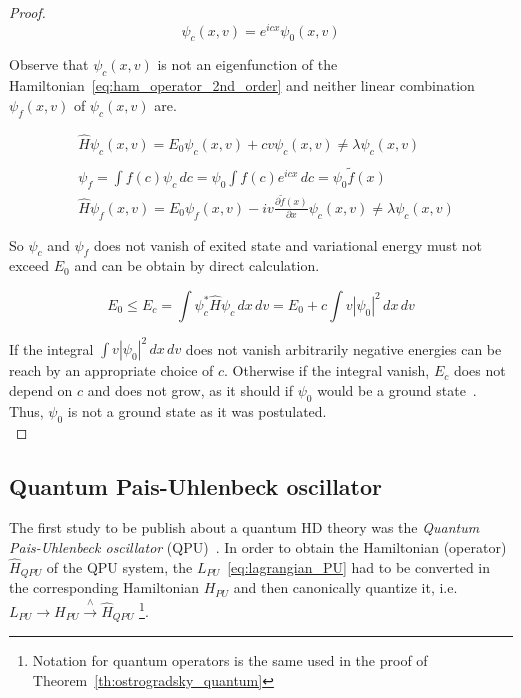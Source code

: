 \begin{proof}
  \begin{equation}
    \psi_c(x, v) = e^{icx}\psi_0(x,v)
  \end{equation}

  Observe that $\psi_c(x,v)$ is not an eigenfunction of the
  Hamiltonian~\eqref{eq:ham_operator_2nd_order} and neither linear combination
  $\psi_f(x,v)$ of $\psi_c(x,v)$ are.

  \begin{align*}
    &\hat{H} \psi_c(x,v) = E_0\psi_c(x, v) + cv \psi_c(x,v)
    \neq \lambda \psi_c(x,v) \\ \\
    &\psi_f = \int f(c) \psi_c \, dc = \psi_0 \int f(c) e^{icx} \, dc =
    \psi_0 \tilde{f}(x) \\
    &\hat{H} \psi_f(x,v) = E_0\psi_f(x, v) -
    iv \frac{\partial \tilde{f}(x)}{\partial x} \psi_c(x,v)
    \neq \lambda \psi_c(x,v)
  \end{align*}

  So $\psi_c$ and $\psi_f$ does not vanish of exited state and variational
  energy must not exceed $E_0$ and can be obtain by direct calculation.

  \begin{equation*}
    E_0 \leq E_c = \int \psi_c^* \hat{H} \psi_c \, dx \, dv =
    E_0 + c \int v \left|\psi_0 \right| ^2 \, dx \, dv
  \end{equation*}

  If the integral $\int v \left|\psi_0 \right| ^2 \, dx \, dv$ does not vanish
  arbitrarily negative energies can be reach by an appropriate choice of $c$.
  Otherwise if the integral vanish, $E_c$ does not depend on $c$ and does not
  grow, as it should if $\psi_0$ would be a ground state~\cite{Smilga17}. Thus,
  $\psi_0$ is not a ground state as it was postulated. \\
\end{proof}


\subsection{Quantum Pais-Uhlenbeck oscillator}
The first study to be publish about a quantum HD theory was the \emph{Quantum
Pais-Uhlenbeck oscillator} (QPU)~\cite{PU50}. In order to obtain the Hamiltonian
(operator) $\hat{H}_{QPU}$ of the QPU system, 
the $L_{PU}$~\eqref{eq:lagrangian_PU} had to be converted in the corresponding
Hamiltonian $H_{PU}$ and then canonically quantize it, i.e.
$L_{PU} \rightarrow H_{PU} \xrightarrow{\wedge} \hat{H}_{QPU}$
\footnote{
  Notation for quantum operators is
  the same used in the proof of Theorem~\ref{th:ostrogradsky_quantum}
}.

